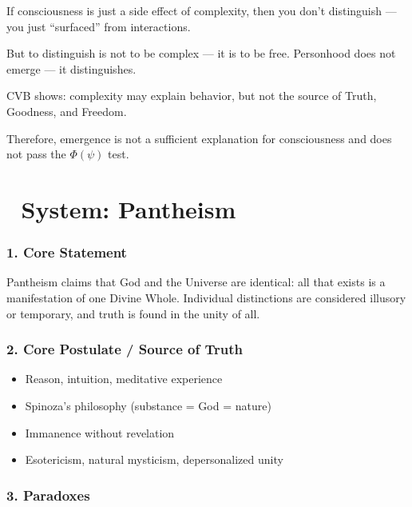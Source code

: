 \documentclass[12pt]{article}
\begin{document}
If consciousness is just a side effect of complexity, then you don’t distinguish — you just ``surfaced'' from interactions.

But to distinguish is not to be complex — it is to be free. Personhood does not emerge — it distinguishes.

CVB shows: complexity may explain behavior, but not the source of Truth, Goodness, and Freedom.

Therefore, emergence is not a sufficient explanation for consciousness and does not pass the $\Phi(\psi)$ test.

\section*{🔷 System: Pantheism}

\subsubsection*{1. Core Statement}

Pantheism claims that God and the Universe are identical: all that exists is a manifestation of one Divine Whole. Individual distinctions are considered illusory or temporary, and truth is found in the unity of all.

\subsubsection*{2. Core Postulate / Source of Truth}

\begin{itemize}
\item Reason, intuition, meditative experience
\item Spinoza’s philosophy (substance = God = nature)
\item Immanence without revelation
\item Esotericism, natural mysticism, depersonalized unity
\end{itemize}

\subsubsection*{3. Paradoxes}
\end{document}
